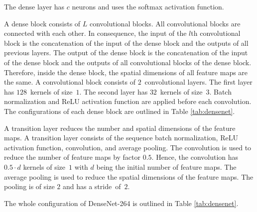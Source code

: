 The dense layer has $c$ neurons and uses the softmax activation function. \autocite{Huang.2017}
\par
A dense block consists of $L$ convolutional blocks. All convolutional blocks are connected with each other. In consequence, the input of the $l$th convolutional block is the concatenation of the input of the dense block and the outputs of all previous layers. The output of the dense block is the concatenation of the input of the dense block and the outputs of all convolutional blocks of the dense block. Therefore, inside the dense block, the spatial dimensions of all feature maps are the same. A convolutional block consists of $2$~convolutional layers. The first layer has $128$~kernels of size~$1$. The second layer has $32$~kernels of size~$3$. Batch normalization and \ac{ReLU} activation function are applied before each convolution. The configurations of each dense block are outlined in Table \ref{tab:densenet}. \autocite{Huang.2017}
\par
A transition layer reduces the number and spatial dimensions of the feature maps.
A transition layer consists of the sequence batch normalization, \ac{ReLU} activation function, convolution, and average pooling. The convolution is used to reduce the number of feature maps by factor $0.5$. Hence, the convolution has $0.5 \cdot d$ kernels of size~$1$ with $d$ being the initial number of feature maps. The average pooling is used to reduce the spatial dimensions of the feature maps. The pooling is of size $2$ and has a stride~of~$2$. \autocite{Huang.2017}
\par
The whole configuration of DenseNet-264 is outlined in Table \ref{tab:densenet}. \autocite{Huang.2017}

